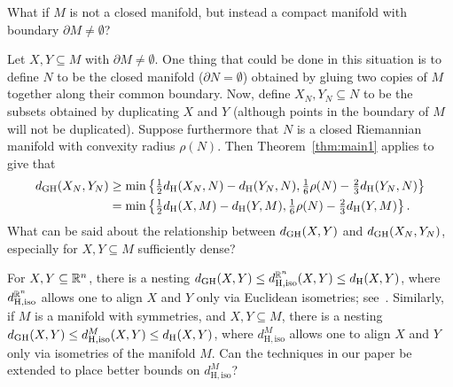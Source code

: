 \documentclass[11pt, reqno, english]{amsart}
\begin{document}
\vspace{3mm}
\begin{question}
What if $M$ is not a closed manifold, but instead a compact manifold with boundary $\partial M \neq \emptyset$?

Let $X,Y \subseteq M$ with $\partial M \neq \emptyset$.
One thing that could be done in this situation is to define $N$ to be the closed manifold ($\partial N = \emptyset$) obtained by gluing two copies of $M$ together along their common boundary.
Now, define $X_N,Y_N\subseteq N$ to be the subsets obtained by duplicating $X$ and $Y$ (although points in the boundary of $M$ will not be duplicated).
Suppose furthermore that $N$ is a closed Riemannian manifold with convexity radius $\rho(N)$.
Then Theorem~\ref{thm:main1} applies to give that
\begin{align*}
d_{\mathrm{GH}}(X_N,Y_N)
&\ge \min\left\{\tfrac{1}{2}d_{\mathrm{H}}(X_N,N)-d_{\mathrm{H}}(Y_N,N), \tfrac{1}{6}\rho(N)-\tfrac{2}{3}d_{\mathrm{H}}(Y_N,N)\right\}\\
&= \min\left\{\tfrac{1}{2}d_{\mathrm{H}}(X,M)-d_{\mathrm{H}}(Y,M), \tfrac{1}{6}\rho(N)-\tfrac{2}{3}d_{\mathrm{H}}(Y,M)\right\}.
\end{align*}
What can be said about the relationship between $d_{\mathrm{GH}}(X,Y)$ and $d_{\mathrm{GH}}(X_N,Y_N)$, especially for $X,Y\subseteq M$ sufficiently dense?
\end{question}

\vspace{3mm}
\begin{question}
For $X,Y\subseteq \mathbb{R}^n$, there is a nesting $d_{\mathrm{GH}}(X,Y) \le d_{\mathrm{H,iso}}^{\mathbb{R}^n}(X,Y) \le d_{\mathrm{H}}(X,Y)$, where $d_{\mathrm{H,iso}}^{\mathbb{R}^n}$ allows one to align $X$ and $Y$ only via Euclidean isometries; see~\cite{majhi2023GH,memoli2008euclidean}.
Similarly, if $M$ is a manifold with symmetries, and $X,Y\subseteq M$, there is a nesting $d_{\mathrm{GH}}(X,Y) \le d_{\mathrm{H,iso}}^M(X,Y) \le d_{\mathrm{H}}(X,Y)$, where $d_{\mathrm{H,iso}}^M$ allows one to align $X$ and $Y$ only via isometries of the manifold $M$.
Can the techniques in our paper be extended to place better bounds on $d_{\mathrm{H,iso}}^M$?
\end{question}
\end{document}
